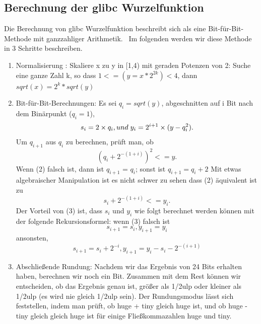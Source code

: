 \documentclass[course=erap]{aspdoc}
\begin{document}
\subsection{ Berechnung der glibc Wurzelfunktion}
Die Berechnung von glibc Wurzelfunktion beschreibt sich als eine Bit-für-Bit-Methode mit ganzzahliger Arithmetik.~\cite{glibc}
Im folgenden werden wir diese Methode in 3 Schritte beschreiben.
\begin{enumerate}
    \item Normalisierung :
          Skaliere x zu y in [1,4) mit geraden Potenzen von 2:
          Suche eine ganze Zahl k, so dass $1 <= (y=x*2^{2k}) < 4$, dann
          $sqrt(x) = 2^k * sqrt(y)$


    \item Bit-für-Bit-Berechnungen:
          Es sei $q_{i}=sqrt(y)$, abgeschnitten auf i Bit nach dem Binärpunkt ($q_{i} = 1$),
          \begin{equation} \label{eq12}
              s_{i}=2\times q_{i}, und \hspace{1mm} y_{i}=2^{i+1} \times (y-q_{i}^{2}).
          \end{equation}
          Um $q_{i+1}$ aus $q_{i}$ zu berechnen, prüft man, ob
          \begin{equation} \label{eq13}
              (q_{i}+2^{-(1+i)})^{2}<=y.
          \end{equation}
          Wenn (2) falsch ist, dann ist $q_{i+1}$ = $q_{i}$; sonst ist $q_{i+1} = q_{i} + 2$
          Mit etwas algebraischer Manipulation ist es nicht schwer zu sehen dass (2) äquivalent ist zu
          \begin{equation} \label{eq14}
              s_{i}+2^{-(1+i)}<=y_{i}.
          \end{equation}
          Der Vorteil von (3) ist, dass $s_{i}$ und $y_{i}$ wie folgt berechnet werden können
          mit der folgende Rekursionsformel:
          wenn (3) falsch ist
          \begin{equation} \label{eq15}
              s_{i+1}=s_{i} ,  y_{i+1}=y_{i}
          \end{equation}
          ansonsten,
          \begin{equation} \label{eq16}
              s_{i+1}=s_{i}+2^{-i} ,  y_{i+1}=y_{i}-s_{i}-2^{-(i+1)}
          \end{equation}
    \item Abschließende Rundung:
          Nachdem wir das Ergebnis von 24 Bits erhalten haben, berechnen wir noch ein Bit.
          Zusammen mit dem Rest können wir entscheiden, ob das
          Ergebnis genau ist, größer als 1/2ulp oder kleiner als 1/2ulp
          (es wird nie gleich 1/2ulp sein).
          Der Rundungsmodus lässt sich feststellen, indem man prüft, ob
          huge + tiny gleich huge ist, und ob huge - tiny gleich
          gleich huge ist für einige Fließkommazahlen huge und tiny.

\end{enumerate}
\end{document}
